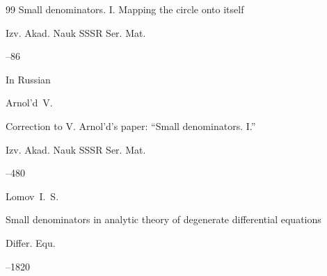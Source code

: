 \begin{thebibliography}{99}
\paper Small denominators. I. Mapping the circle onto itself

\jour Izv. Akad. Nauk SSSR Ser. Mat.




--86



\moreref

\lang In Russian

\by Arnol'd~V.

\paper Correction to V. Arnol'd's paper: ``Small denominators. I.''

\jour Izv. Akad. Nauk SSSR Ser. Mat. 




--480








\by Lomov~I.~S.

\paper Small denominators in analytic theory of degenerate differential equations

\jour Differ. Equ.



--1820 









\end{thebibliography}



\EngDate





\newpage

\Russian



%

